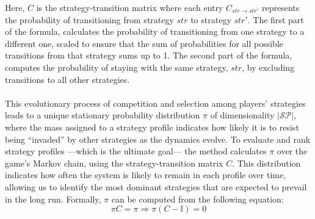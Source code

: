 \begin{flushleft}
\begin{flushleft}
        Here, $C$ is the strategy-transition matrix where each entry $C_{str \to str'}$ represents the probability of transitioning from strategy $str$ to strategy $str'$. The first part of the formula, calculates the probability of transitioning from one strategy to a different one, scaled to ensure that the sum of probabilities for all possible transitions from that strategy sums up to 1. The second part of the formula, computes the probability of staying with the same strategy, $str$, by excluding transitions to all other strategies.\\~\\

        This evolutionary process of competition and selection among players' strategies leads to a unique stationary probability distribution $\pi$ of dimensionality $|\mathcal{SP}|$, where the mass assigned to a strategy profile indicates how likely it is to resist being ``invaded'' by other strategies as the dynamics evolve. To evaluate and rank strategy profiles —which is the ultimate goal— the method calculates $\pi$ over the game's Markov chain, using the strategy-transition matrix $C$. This distribution indicates how often the system is likely to remain in each profile over time, allowing us to identify the most dominant strategies that are expected to prevail in the long run. Formally, $\pi$ can be computed from the following equation:
        \begin{equation}
            \pi C = \pi \Rightarrow \pi (C - \mathbb{I}) = 0 
            \label{eq:stationary_distribution}
        \end{equation}


\end{flushleft}
\end{flushleft}
